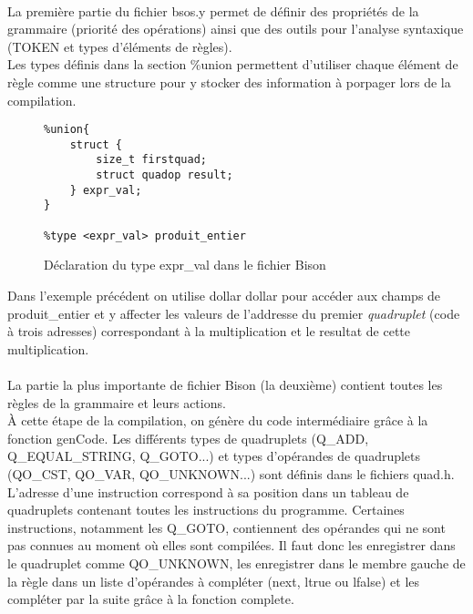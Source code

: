 \paragraph{}
La première partie du fichier \textsf{bsos.y} permet de définir des propriétés de la grammaire (priorité des opérations) ainsi que des outils pour l'analyse syntaxique (TOKEN et types d'éléments de règles).\\
Les types définis dans la section \textsf{\%union} permettent d'utiliser chaque élément de règle comme une structure pour y stocker des information à porpager lors de la compilation.
\begin{figure}[H]
\begin{lstlisting}
%union{
    struct {
        size_t firstquad;
        struct quadop result;
    } expr_val;
}

%type <expr_val> produit_entier
\end{lstlisting}
\caption{Déclaration du type \textsf{expr\_val} dans le fichier \textsf{Bison}}
\end{figure}
Dans l'exemple précédent on utilise \textsf{dollar dollar} pour accéder aux champs de \textsf{produit\_entier} et y affecter les valeurs de l'addresse du premier \textit{quadruplet} (code à trois adresses) correspondant à la multiplication et le resultat de cette multiplication.\\

\paragraph{}
La partie la plus importante de fichier \textsf{Bison} (la deuxième) contient toutes les règles de la grammaire et leurs actions.\\
\`A cette étape de la compilation, on génère du code intermédiaire grâce à la fonction \textsf{genCode}. Les différents types de quadruplets (\textsf{Q\_ADD}, \textsf{Q\_EQUAL\_STRING}, \textsf{Q\_GOTO}...) et types d'opérandes de quadruplets (\textsf{QO\_CST}, \textsf{QO\_VAR}, \textsf{QO\_UNKNOWN}...) sont définis dans le fichiers \textsf{quad.h}.\\
L'adresse d'une instruction correspond à sa position dans un tableau de quadruplets contenant toutes les instructions du programme. Certaines instructions, notamment les \textsf{Q\_GOTO}, contiennent des opérandes qui ne sont pas connues au moment où elles sont compilées. Il faut donc les enregistrer dans le quadruplet comme \textsf{QO\_UNKNOWN}, les enregistrer dans le membre gauche de la règle dans un liste d'opérandes à compléter (\textsf{next}, \textsf{ltrue} ou \textsf{lfalse}) et les compléter par la suite grâce à la fonction \textsf{complete}.
